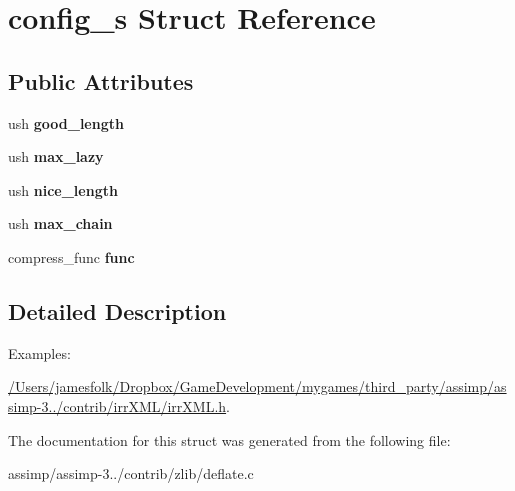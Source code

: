 \hypertarget{structconfig__s}{\section{config\+\_\+s Struct Reference}
\label{structconfig__s}
}
\subsection*{Public Attributes}
\begin{DoxyCompactItemize}
\item 
\hypertarget{structconfig__s_a36152319fbe49bebbc0354f8bcb617a6}{ush {\bfseries good\+\_\+length}}\label{structconfig__s_a36152319fbe49bebbc0354f8bcb617a6}

\item 
\hypertarget{structconfig__s_afecf50eeeb2afca11ab28d344280231b}{ush {\bfseries max\+\_\+lazy}}\label{structconfig__s_afecf50eeeb2afca11ab28d344280231b}

\item 
\hypertarget{structconfig__s_af2a1e023e10d6e0c9ff64f8c0c4c9894}{ush {\bfseries nice\+\_\+length}}\label{structconfig__s_af2a1e023e10d6e0c9ff64f8c0c4c9894}

\item 
\hypertarget{structconfig__s_ac0ef64600cf4487e3754a21934ffdb89}{ush {\bfseries max\+\_\+chain}}\label{structconfig__s_ac0ef64600cf4487e3754a21934ffdb89}

\item 
\hypertarget{structconfig__s_aea5a0fe31d694079966523a49d60174b}{compress\+\_\+func {\bfseries func}}\label{structconfig__s_aea5a0fe31d694079966523a49d60174b}

\end{DoxyCompactItemize}


\subsection{Detailed Description}
\begin{Desc}
\item[Examples\+: ]\par
\hyperlink{_2_users_2jamesfolk_2_dropbox_2_game_development_2mygames_2third_party_2assimp_2assimp-3_81_81_2b1dcc9df1e93e2ac9c863740ad4632a8}{/\+Users/jamesfolk/\+Dropbox/\+Game\+Development/mygames/third\+\_\+party/assimp/assimp-\/3../contrib/irr\+X\+M\+L/irr\+X\+M\+L.\+h}.\end{Desc}


The documentation for this struct was generated from the following file\+:\begin{DoxyCompactItemize}
\item 
assimp/assimp-\/3../contrib/zlib/deflate.\+c\end{DoxyCompactItemize}
